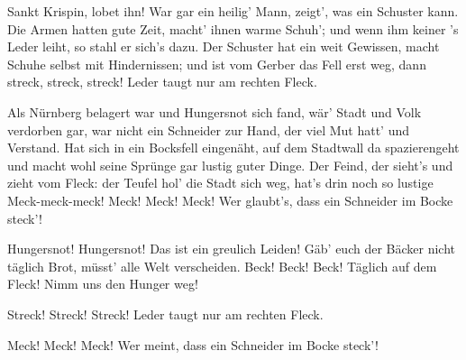 \begin{drama}


Sankt Krispin, lobet ihn!
War gar ein heilig' Mann,
zeigt', was ein Schuster kann.
Die Armen hatten gute Zeit,
macht' ihnen warme Schuh';
und wenn ihm keiner 's Leder leiht,
so stahl er sich's dazu.
Der Schuster hat ein weit Gewissen,
macht Schuhe selbst mit Hindernissen;
und ist vom Gerber das Fell erst weg,
dann streck, streck, streck!
Leder taugt nur am rechten Fleck.






Als Nürnberg belagert war
und Hungersnot sich fand,
wär' Stadt und Volk verdorben gar,
war nicht ein Schneider zur Hand,
der viel Mut hatt' und Verstand.
Hat sich in ein Bocksfell eingenäht,
auf dem Stadtwall da spazierengeht
und macht wohl seine Sprünge
gar lustig guter Dinge.
Der Feind, der sieht's und zieht vom Fleck:
der Teufel hol' die Stadt sich weg,
hat's drin noch so lustige Meck-meck-meck!
Meck! Meck! Meck!
Wer glaubt's, dass ein Schneider im Bocke steck'!



Hungersnot! Hungersnot!
Das ist ein greulich Leiden!
Gäb' euch der Bäcker nicht täglich Brot,
müsst' alle Welt verscheiden.
Beck! Beck! Beck!
Täglich auf dem Fleck!
Nimm uns den Hunger weg!



Streck! Streck! Streck!
Leder taugt nur am rechten Fleck.



Meck! Meck! Meck!
Wer meint, dass ein Schneider im Bocke steck'!






\end{drama}

